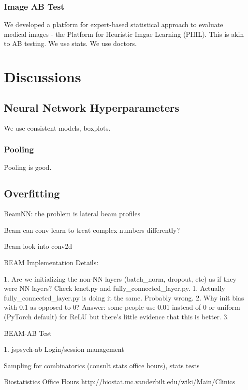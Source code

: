 \documentclass{article}
\begin{document}
\subsubsection{Image AB Test}

We developed a platform for expert-based statistical approach to evaluate
medical images - the Platform for Heuristic Imgae Learning (PHIL).
This is akin to A\/B testing. We use stats. We use doctors.


\section{Discussions}
\subsection{Neural Network Hyperparameters}

We use consistent models, boxplots.
\subsubsection{Pooling}
Pooling is good.


\subsection{Overfitting}







BeamNN: the problem is lateral beam profiles

Beam can conv learn to treat complex numbers differently?

Beam look into conv2d


BEAM Implementation Details:

1. Are we initializing the non-NN layers (batch_norm, dropout, etc) as if they were NN layers? Check lenet.py and fully_connected_layer.py.
    1. Actually fully_connected_layer.py is doing it the same. Probably wrong.
2. Why init bias with 0.1 as opposed to 0? Answer: some people use 0.01 instead of 0 or uniform (PyTorch default)  for ReLU but there’s little evidence that this is better.
3.

BEAM-AB Test

1. jspsych-ab Login/session management

Sampling for combinatorics (consult stats office hours), stats tests

Biostatistics Office Hours http://biostat.mc.vanderbilt.edu/wiki/Main/Clinics
\end{document}
